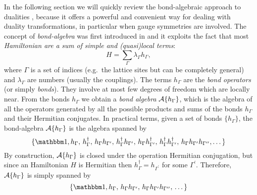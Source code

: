 In the following section we will quickly review the bond-algebraic approach to dualities \cite{cobanera2011bond}, because it offers a powerful and convenient way for dealing with duality transformations, in particular when gauge symmetries are involved.
The concept of \emph{bond-algebra} was first introduced in \cite{nussinov2009bond} and it exploits the fact that most \emph{Hamiltonian are a sum of simple and (quasi)local terms}:
\begin{equation}
    H = \sum_{\Gamma} \lambda_{\Gamma} h_{\Gamma},
\end{equation}
where $\Gamma$ is a set of indices (e.g.~the lattice sites but can be completely general) and $\lambda_{\Gamma}$ are numbers (usually the couplings).
The terms $h_{\Gamma}$ are the \emph{bond operators} (or simply \emph{bonds}).
They involve at most few degrees of freedom which are locally near.
From the bonds $h_{\Gamma}$ we obtain a \emph{bond algebra} $\mathcal{A}\{h_{\Gamma}\}$, which is the algebra of all the operators generated by all the possible products and sums of the bonds $h_{\Gamma}$ and their Hermitian conjugates.
In practical terms, given a set of bonds $\{h_{\Gamma}\}$, the bond-algebra $\mathcal{A}\{h_{\Gamma}\}$ is the algebra spanned by
\begin{equation}
    \{
        \identity, h_{\Gamma}, \,
        h_{\Gamma}^{\dagger}, \,
        h_{\Gamma} h_{\Gamma^{\prime}}, \,
        h_{\Gamma}^{\dagger}  h_{\Gamma^{\prime}}, \,
        h_{\Gamma} h_{\Gamma^{\prime}}^{\dagger}, \,
        h_{\Gamma}^{\dagger}  h_{\Gamma^{\prime}}^{\dagger}, \,
        h_{\Gamma} h_{\Gamma^{\prime}} h_{\Gamma^{\prime\prime}},
        \dots
    \}
\end{equation}
By construction, $\mathcal{A}\{h_{\Gamma}\}$ is closed under the operation Hermitian conjugation, but since an Hamiltonian $H$ is Hermitian then $h_{\Gamma}^{\dagger} = h_{\Gamma^{\prime}}$ for some $\Gamma^{\prime}$.
Therefore, $\mathcal{A} \{h_{\Gamma}\}$ is simply spanned by
\begin{equation}
    \{
        \identity,
        h_{\Gamma}, \,
        h_{\Gamma} h_{\Gamma^{\prime}}, \,
        h_{\Gamma} h_{\Gamma^{\prime}} h_{\Gamma^{\prime\prime}}, \,
        \dots
    \}
\end{equation}


